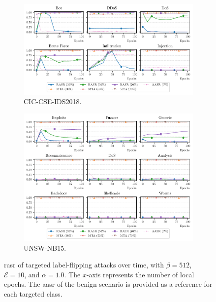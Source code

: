 \begin{figure}
  \centering
  \begin{subfigure}{\linewidth}
    \centering
    \includegraphics[width=\linewidth]{figures/cicids/backdoors}
    \caption{
      CIC-CSE-IDS2018.
      \label{fig:backdoors.cicids}
    }
  \end{subfigure}
  \begin{subfigure}{\linewidth}
    \centering
    \includegraphics[width=\linewidth]{figures/nb15/backdoors}
    \caption{
      UNSW-NB15.
      \label{fig:backdoors.nb15}
    }
  \end{subfigure}
  \caption[
    \Gls{rasr} of targeted label-flipping attacks over time.
  ]{
    \Gls{rasr} of targeted label-flipping attacks over time, with $\beta=512$, $\mathcal{E}=10$, and $\alpha=1.0$.
    The $x$-axis represents the number of local epochs.
    The \gls{aasr} of the benign scenario is provided as a reference for each targeted class.
    \label{fig:backdoors}
  }
\end{figure}


